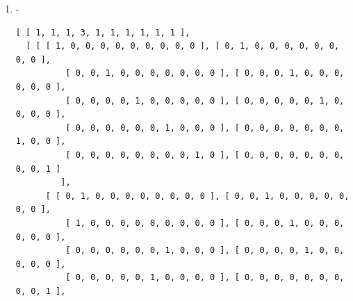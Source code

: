 \documentclass[a4paper, 10pt]{book}
\theoremstyle{definition}
\numberwithin{equation}{chapter}
\begin{document}
\begin{appendices}
\begin{enumerate}
\begin{lstlisting}[numbers=none]
          [ 0, 0, 1, 0, 0, 0, 0, 0, 0, 0 ], [ 0, 0, 0, 0, 0, 0, 0, 0, 0, 1 ] 
         ], 
      [ [ 0, 0, 0, 0, 0, 0, 1, 0, 0, 0 ], [ 0, 0, 0, 0, 1, 0, 0, 0, 0, 0 ], 
          [ 0, 0, 0, 0, 0, 0, 0, 0, 1, 0 ], [ 0, 0, 1, 0, 0, 0, 0, 0, 0, 0 ],
          [ 0, 0, 0, 0, 0, 0, 0, 1, 0, 0 ], [ 1, 0, 0, 0, 0, 0, 0, 0, 0, 0 ],
          [ 0, 0, 0, 0, 0, 1, 0, 0, 0, 0 ], [ 0, 1, 0, 0, 0, 0, 0, 0, 0, 0 ],
          [ 0, 0, 0, 1, 0, 0, 0, 0, 0, 0 ], [ 0, 0, 0, 0, 0, 0, 0, 0, 0, 1 ] 
         ], 
      [ [ 0, 0, 0, 0, 0, 0, 0, 1, 0, 0 ], [ 0, 0, 0, 1, 0, 0, 0, 0, 0, 0 ], 
          [ 0, 0, 0, 0, 0, 1, 0, 0, 0, 0 ], [ 0, 0, 0, 0, 0, 0, 1, 0, 0, 0 ],
          [ 0, 0, 1, 0, 0, 0, 0, 0, 0, 0 ], [ 0, 0, 0, 0, 1, 0, 0, 0, 0, 0 ],
          [ 0, 1, 0, 0, 0, 0, 0, 0, 0, 0 ], [ 0, 0, 0, 0, 0, 0, 0, 0, 1, 0 ],
          [ 1, 0, 0, 0, 0, 0, 0, 0, 0, 0 ], [ 0, 0, 0, 0, 0, 0, 0, 0, 0, 1 ] 
         ], 
      [ [ 0, 0, 0, 0, 0, 0, 0, 0, 1, 0 ], [ 0, 0, 0, 0, 0, 0, 1, 0, 0, 0 ], 
          [ 0, 0, 0, 0, 1, 0, 0, 0, 0, 0 ], [ 0, 1, 0, 0, 0, 0, 0, 0, 0, 0 ],
          [ 0, 0, 0, 0, 0, 1, 0, 0, 0, 0 ], [ 0, 0, 1, 0, 0, 0, 0, 0, 0, 0 ],
          [ 0, 0, 0, 1, 0, 0, 0, 0, 0, 0 ], [ 1, 0, 0, 0, 0, 0, 0, 0, 0, 0 ],
          [ 0, 0, 0, 0, 0, 0, 0, 1, 0, 0 ], [ 0, 0, 0, 0, 0, 0, 0, 0, 0, 1 ] 
         ], 
      [ [ 0, 0, 0, 0, 0, 0, 0, 0, 0, 1 ], [ 0, 0, 0, 0, 0, 0, 0, 0, 0, 1 ], 
          [ 0, 0, 0, 0, 0, 0, 0, 0, 0, 1 ], [ 0, 0, 0, 0, 0, 0, 0, 0, 0, 1 ],
          [ 0, 0, 0, 0, 0, 0, 0, 0, 0, 1 ], [ 0, 0, 0, 0, 0, 0, 0, 0, 0, 1 ],
          [ 0, 0, 0, 0, 0, 0, 0, 0, 0, 1 ], [ 0, 0, 0, 0, 0, 0, 0, 0, 0, 1 ],
          [ 0, 0, 0, 0, 0, 0, 0, 0, 0, 1 ], [ 1, 1, 1, 1, 1, 1, 1, 1, 1, 0 ] 
         ] ] ]
	\end{lstlisting}
	\item -\begin{lstlisting}[numbers=none]
	[ [ 1, 1, 1, 3, 1, 1, 1, 1, 1, 1 ], 
  [ [ [ 1, 0, 0, 0, 0, 0, 0, 0, 0, 0 ], [ 0, 1, 0, 0, 0, 0, 0, 0, 0, 0 ], 
          [ 0, 0, 1, 0, 0, 0, 0, 0, 0, 0 ], [ 0, 0, 0, 1, 0, 0, 0, 0, 0, 0 ],
          [ 0, 0, 0, 0, 1, 0, 0, 0, 0, 0 ], [ 0, 0, 0, 0, 0, 1, 0, 0, 0, 0 ],
          [ 0, 0, 0, 0, 0, 0, 1, 0, 0, 0 ], [ 0, 0, 0, 0, 0, 0, 0, 1, 0, 0 ],
          [ 0, 0, 0, 0, 0, 0, 0, 0, 1, 0 ], [ 0, 0, 0, 0, 0, 0, 0, 0, 0, 1 ] 
         ], 
      [ [ 0, 1, 0, 0, 0, 0, 0, 0, 0, 0 ], [ 0, 0, 1, 0, 0, 0, 0, 0, 0, 0 ], 
          [ 1, 0, 0, 0, 0, 0, 0, 0, 0, 0 ], [ 0, 0, 0, 1, 0, 0, 0, 0, 0, 0 ],
          [ 0, 0, 0, 0, 0, 0, 1, 0, 0, 0 ], [ 0, 0, 0, 0, 1, 0, 0, 0, 0, 0 ],
          [ 0, 0, 0, 0, 0, 1, 0, 0, 0, 0 ], [ 0, 0, 0, 0, 0, 0, 0, 0, 0, 1 ],

\end{lstlisting}
\end{enumerate}
\end{appendices}
\end{document}

